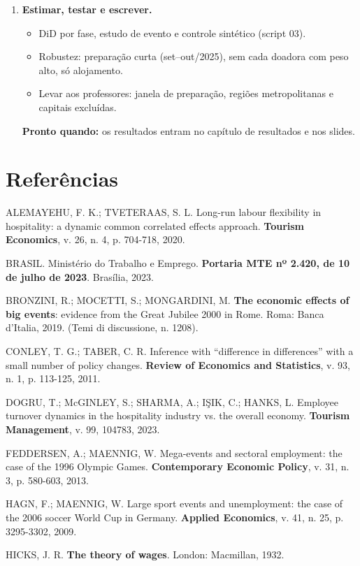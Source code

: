 \documentclass[11pt,a4paper]{article}
\newcommand{\pronto}[1]{\par\smallskip\noindent\textcolor{verde}{\textbf{Pronto quando:}} #1}
\begin{document}
\begin{enumerate}[label=\textbf{\arabic*.}, leftmargin=*, itemsep=6pt]
\item \textbf{Estimar, testar e escrever.}
  \begin{itemize}
    \item DiD por fase, estudo de evento e controle sintético (script 03).
    \item Robustez: preparação curta (set--out/2025), sem cada doadora com peso alto, só alojamento.
    \item Levar aos professores: janela de preparação, regiões metropolitanas e capitais excluídas.
  \end{itemize}
  \pronto{os resultados entram no capítulo de resultados e nos slides.}
\end{enumerate}

\section*{Referências}
\begin{small}
\setlength{\parindent}{0pt}\setlength{\parskip}{4pt}\raggedright

ALEMAYEHU, F. K.; TVETERAAS, S. L. Long-run labour flexibility in hospitality: a dynamic common correlated effects approach. \textbf{Tourism Economics}, v. 26, n. 4, p. 704-718, 2020.

BRASIL. Ministério do Trabalho e Emprego. \textbf{Portaria MTE nº 2.420, de 10 de julho de 2023}. Brasília, 2023.

BRONZINI, R.; MOCETTI, S.; MONGARDINI, M. \textbf{The economic effects of big events}: evidence from the Great Jubilee 2000 in Rome. Roma: Banca d'Italia, 2019. (Temi di discussione, n. 1208).

CONLEY, T. G.; TABER, C. R. Inference with ``difference in differences'' with a small number of policy changes. \textbf{Review of Economics and Statistics}, v. 93, n. 1, p. 113-125, 2011.

DOGRU, T.; McGINLEY, S.; SHARMA, A.; IŞIK, C.; HANKS, L. Employee turnover dynamics in the hospitality industry vs. the overall economy. \textbf{Tourism Management}, v. 99, 104783, 2023.

FEDDERSEN, A.; MAENNIG, W. Mega-events and sectoral employment: the case of the 1996 Olympic Games. \textbf{Contemporary Economic Policy}, v. 31, n. 3, p. 580-603, 2013.

HAGN, F.; MAENNIG, W. Large sport events and unemployment: the case of the 2006 soccer World Cup in Germany. \textbf{Applied Economics}, v. 41, n. 25, p. 3295-3302, 2009.

HICKS, J. R. \textbf{The theory of wages}. London: Macmillan, 1932.
\end{small}
\end{document}
